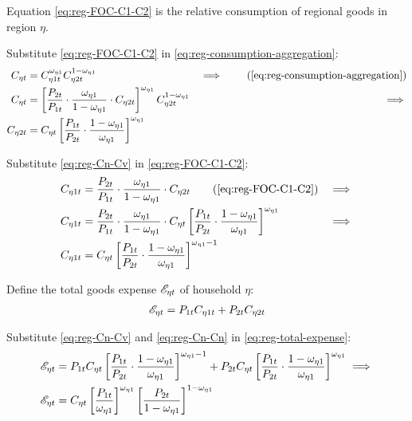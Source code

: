 \documentclass[
thesis.tex
]{subfiles}
\begin{document}
Equation \ref{eq:reg-FOC-C1-C2} is the relative consumption of regional goods in region $\eta$.

Substitute \ref{eq:reg-FOC-C1-C2} in \ref{eq:reg-consumption-aggregation}:
\begin{alignat}{2}
	C_{\eta t} &= C_{\eta 1 t}^{\omega_{\eta 1}} C_{\eta 2 t}^{1-\omega_{\eta 1}} &\implies \tag{\ref{eq:reg-consumption-aggregation}} \\
	C_{\eta t} &= \left[ \frac{P_{2 t}}{P_{1 t}} \cdot \frac{\omega_{\eta 1}}{1 -\omega_{\eta 1}} \cdot C_{\eta 2 t} \right]^{\omega_{\eta 1}} C_{\eta 2 t}^{1-\omega_{\eta 1}} &\implies \nonumber \\
	C_{\eta 2 t} &= C_{\eta t} \left[ \frac{P_{1 t}}{P_{2 t}} \cdot \frac{1 -\omega_{\eta 1}}{\omega_{\eta 1}} \right]^{\omega_{\eta 1}} \label{eq:reg-Cn-Cv}
\end{alignat}

Substitute \ref{eq:reg-Cn-Cv} in \ref{eq:reg-FOC-C1-C2}:
\begin{alignat}{2}
	C_{\eta 1 t} &= \frac{P_{2 t}}{P_{1 t}} \cdot \frac{\omega_{\eta 1}}{1 -\omega_{\eta 1}} \cdot C_{\eta 2 t} \tag{\ref{eq:reg-FOC-C1-C2}} &\implies \nonumber \\
	C_{\eta 1 t} &= \frac{P_{2 t}}{P_{1 t}} \cdot \frac{\omega_{\eta 1}}{1 -\omega_{\eta 1}} \cdot C_{\eta t} \left[ \frac{P_{1 t}}{P_{2 t}} \cdot \frac{1 -\omega_{\eta 1}}{\omega_{\eta 1}} \right]^{\omega_{\eta 1}} &\implies \nonumber \\
	C_{\eta 1 t} &= C_{\eta t} \left[ \frac{P_{1 t}}{P_{2 t}} \cdot \frac{1 -\omega_{\eta 1}}{\omega_{\eta 1}} \right]^{\omega_{\eta 1} -1} \label{eq:reg-Cn-Cn}
\end{alignat}

Define the total goods expense ${\mathscr{E}_{\eta t}}$ of household $\eta$:
\begin{align}
	{\mathscr{E}_{\eta t}} = P_{1 t} C_{\eta 1 t} + P_{2 t} C_{\eta 2 t} \label{eq:reg-total-expense}
\end{align}

Substitute \ref{eq:reg-Cn-Cv} and \ref{eq:reg-Cn-Cn} in \ref{eq:reg-total-expense}:
\begin{align}
	{\mathscr{E}_{\eta t}} &= P_{1 t} C_{\eta t} \left[ \frac{P_{1 t}}{P_{2 t}} \cdot \frac{1 -\omega_{\eta 1}}{\omega_{\eta 1}} \right]^{\omega_{\eta 1} -1} + P_{2 t} C_{\eta t} \left[ \frac{P_{1 t}}{P_{2 t}} \cdot \frac{1 -\omega_{\eta 1}}{\omega_{\eta 1}} \right]^{\omega_{\eta 1}} \implies \nonumber \\
	{\mathscr{E}_{\eta t}} &= C_{\eta t} \left[ \frac{P_{1 t}}{\omega_{\eta 1}} \right]^{\omega_{\eta 1}} \left[ \frac{P_{2 t}}{1 -\omega_{\eta 1}} \right]^{1 -\omega_{\eta 1}} \label{eq:reg-total-expense-level}
\end{align}
\end{document}

